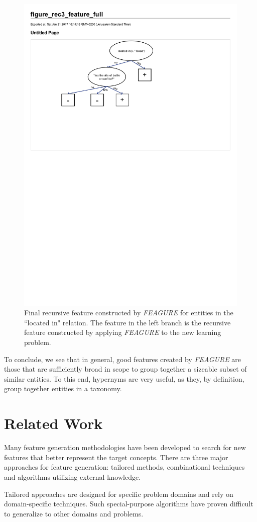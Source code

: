\documentclass[twoside,11pt]{article}
\theoremstyle{definition}
\begin{document}
\begin{figure}[!h]
	\centering
	\includegraphics[width=0.6\linewidth]{figure_rec3_feature_full}
	\caption{Final recursive feature constructed by \emph{FEAGURE} for entities in the ``located in" relation. The feature in the left branch is the recursive feature constructed by applying \emph{FEAGURE} to the new learning problem.}
	\label{fig:figure_rec3_feature_full}
\end{figure}

To conclude, we see that in general, good features created by \emph{FEAGURE} are those that are sufficiently broad in scope to group together a sizeable subset of similar entities. To this end, hypernyms are very useful, as they, by definition, group together entities in a taxonomy. 

\section{Related Work}

Many feature generation methodologies have been developed to search for new features that better represent the target concepts. There are three major approaches for feature generation: tailored methods, combinational techniques and algorithms utilizing external knowledge.

Tailored approaches \cite{sutton1991learning,hirsh1994bootstrapping} are designed for specific problem domains and rely on domain-specific techniques. %
Such special-purpose algorithms %
 have proven difficult to generalize to other domains and problems.
\end{document}
